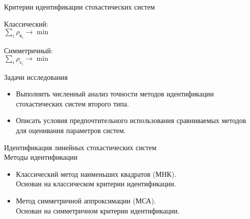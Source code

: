 \documentclass[hyperref={pdftex,unicode}]{beamer}
\begin{document}
\begin{frame}{Критерии идентификации стохастических систем}
  \begin{minipage}{0.45\linewidth}
    \centering
    
    Классический: \\
    \( \sum_i \rho_{\text{к}_i} \rightarrow \min \)
  \end{minipage}
  \hfill
  \begin{minipage}{0.45\linewidth}
    \centering
    
    Симметричный: \\
    \( \sum_i \rho_{\text{с}_i} \rightarrow \min \)
  \end{minipage}
\end{frame}

\begin{frame}{Задачи исследования}
  \begin{itemize}
  \item Выполнить численный анализ точности
    методов идентификации стохастических систем второго типа.
  \item Описать условия предпочтительного использования
    сравниваемых методов для оценивания параметров систем.
  \end{itemize}
\end{frame}

\begin{frame}{%
    Идентификация линейных стохастических систем \\
    \small{Методы идентификации}
  }
  \begin{itemize}
  \item Классический метод наименьших квадратов (МНК). \\
    Основан на классическом критерии идентификации.
  \item Метод симметричной аппроксимации (МСА). \\
    Основан на симметричном критерии идентификации.
  \end{itemize}
\end{frame}
\end{document}
